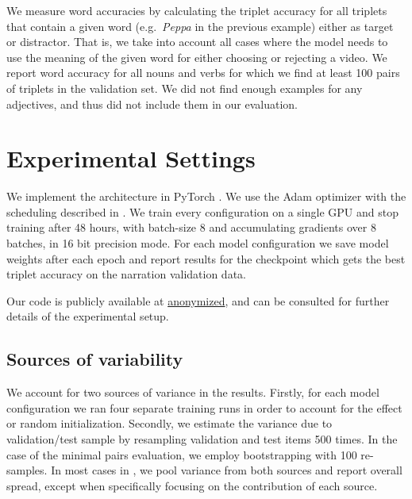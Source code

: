 We measure word accuracies by calculating the triplet accuracy 
for all triplets that contain a given word (e.g.\ 
\textit{Peppa} in the previous example) either as target or distractor. 
That is, we take into account all cases where the model needs to use 
the meaning of the given word for either choosing or rejecting a video. 
We report word accuracy for all nouns and verbs for which we find at least 
100 pairs of triplets in the validation set. We did not find enough examples for any 
adjectives, and thus did not include them in our evaluation.



\section{Experimental Settings}
We implement the architecture in PyTorch \citep{NEURIPS2019_9015}. We
use the Adam optimizer \citep{kingma2014adam} with the scheduling
described in \citep{devlin-etal-2019-bert}. We train every
configuration on a single GPU and stop training after 48 hours, with
batch-size 8 and accumulating gradients over 8 batches, in 16 bit
precision mode. For each model configuration we save model weights
after each epoch and report results for the checkpoint which gets the
best triplet accuracy on the narration validation data. 

Our code is publicly available at \url{anonymized},
and can be consulted for further details of the experimental setup.



\subsection{Sources of variability}
\label{sec:variability}
We account for two sources of variance in the results. Firstly, for
each model configuration we ran four separate training runs in order
to account for the effect or random initialization. Secondly, we
estimate the variance due to validation/test sample by 
resampling validation and test items 500 times. In the case of the minimal 
pairs evaluation, we employ bootstrapping with 100 re-samples. In most
cases in \Cref{sec:results}, we pool variance from both sources and report
overall spread, except when specifically focusing on the contribution
of each source.
